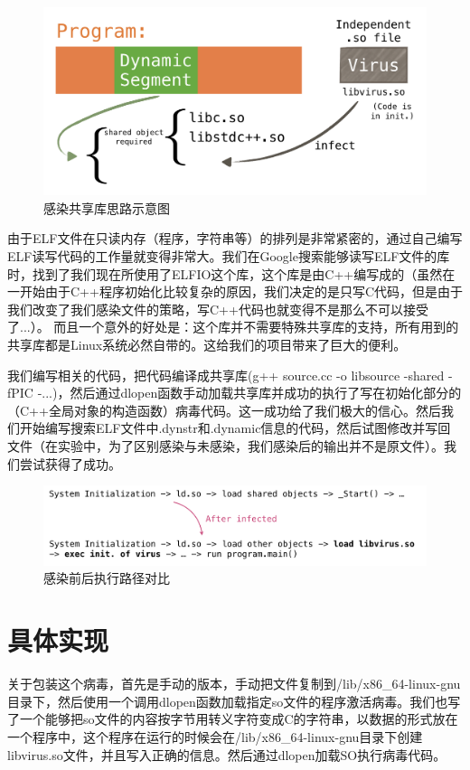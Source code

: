 \documentclass[a4paper, 11pt]{article}
\begin{document}
\begin{figure}[htbp]
		\centering
		\includegraphics[width = \textwidth]{figures/fig4_ld1}
		\caption{感染共享库思路示意图}
		\label{fig:way4}
\end{figure}

由于ELF文件在只读内存（程序，字符串等）的排列是非常紧密的，通过自己编写ELF读写代码的工作量就变得非常大。我们在Google搜索能够读写ELF文件的库时，找到了我们现在所使用了ELFIO这个库，这个库是由C++编写成的（虽然在一开始由于C++程序初始化比较复杂的原因，我们决定的是只写C代码，但是由于我们改变了我们感染文件的策略，写C++代码也就变得不是那么不可以接受了...）。 而且一个意外的好处是：这个库并不需要特殊共享库的支持，所有用到的共享库都是Linux系统必然自带的。这给我们的项目带来了巨大的便利。

我们编写相关的代码，把代码编译成共享库(g++ source.cc -o libsource -shared -fPIC -...)，然后通过dlopen函数手动加载共享库并成功的执行了写在初始化部分的（C++全局对象的构造函数）病毒代码。这一成功给了我们极大的信心。然后我们开始编写搜索ELF文件中.dynstr和.dynamic信息的代码，然后试图修改并写回文件（在实验中，为了区别感染与未感染，我们感染后的输出并不是原文件）。我们尝试获得了成功。
\begin{figure}[htbp]
		\centering
		\includegraphics[width = \textwidth]{figures/fig5_ld2}
		\caption{感染前后执行路径对比}
		\label{fig:way4}
\end{figure}

\section{具体实现}
关于包装这个病毒，首先是手动的版本，手动把文件复制到/lib/x86\_64-linux-gnu目录下，然后使用一个调用dlopen函数加载指定so文件的程序激活病毒。我们也写了一个能够把so文件的内容按字节用转义字符变成C的字符串，以数据的形式放在一个程序中，这个程序在运行的时候会在/lib/x86\_64-linux-gnu目录下创建libvirus.so文件，并且写入正确的信息。然后通过dlopen加载SO执行病毒代码。
\end{document}
